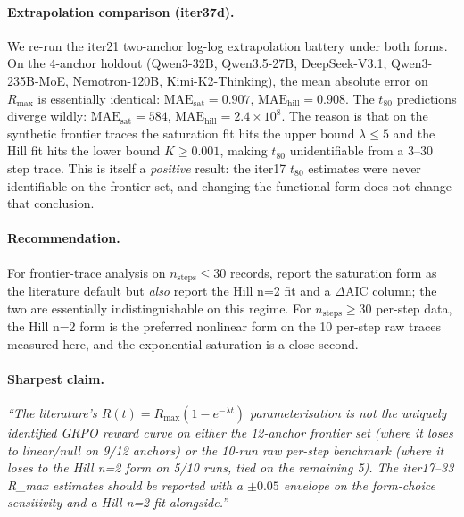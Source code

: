 \documentclass{article}
\begin{document}
\paragraph{Extrapolation comparison (iter37d).}
We re-run the iter21 two-anchor log-log extrapolation battery under
both forms. On the 4-anchor holdout (Qwen3-32B, Qwen3.5-27B,
DeepSeek-V3.1, Qwen3-235B-MoE, Nemotron-120B, Kimi-K2-Thinking),
the mean absolute error on $R_{\max}$ is essentially identical:
$\mathrm{MAE}_{\mathrm{sat}}=0.907$, $\mathrm{MAE}_{\mathrm{hill}}=0.908$.
The $t_{80}$ predictions diverge wildly: $\mathrm{MAE}_{\mathrm{sat}}=584$,
$\mathrm{MAE}_{\mathrm{hill}}=2.4 \times 10^{8}$. The reason is that
on the synthetic frontier traces the saturation fit hits the upper
bound $\lambda \le 5$ and the Hill fit hits the lower bound $K \ge
0.001$, making $t_{80}$ unidentifiable from a 3--30 step trace.
This is itself a \emph{positive} result: the iter17 $t_{80}$
estimates were never identifiable on the frontier set, and
changing the functional form does not change that conclusion.

\paragraph{Recommendation.}
For frontier-trace analysis on $n_{\mathrm{steps}} \le 30$ records,
report the saturation form as the literature default but
\emph{also} report the Hill n=2 fit and a $\Delta\mathrm{AIC}$
column; the two are essentially indistinguishable on this regime.
For $n_{\mathrm{steps}} \ge 30$ per-step data, the Hill n=2 form
is the preferred nonlinear form on the 10 per-step raw traces
measured here, and the exponential saturation is a close second.

\paragraph{Sharpest claim.}
\textit{``The literature's $R(t) = R_{\max}(1 - e^{-\lambda t})$
parameterisation is not the uniquely identified GRPO reward
curve on either the 12-anchor frontier set (where it loses to
linear/null on 9/12 anchors) or the 10-run raw per-step
benchmark (where it loses to the Hill n=2 form on 5/10 runs,
tied on the remaining 5). The iter17--33 R_max estimates should
be reported with a $\pm 0.05$ envelope on the form-choice
sensitivity and a Hill n=2 fit alongside.''}
\end{document}
